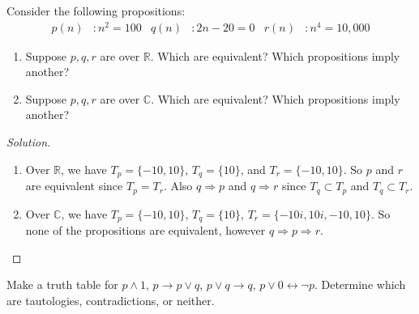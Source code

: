     \begin{problem}
    Consider the following propositions:
    \begin{align*}
        p(n)&:n^{2}=100 & q(n)&:2n-20=0 & r(n)&:n^{4}=10,000
    \end{align*}
    \begin{enumerate}
        \item Suppose $p,q,r$ are over $\mathbb{R}$. Which are equivalent? Which propositions imply another?
        \item Suppose $p,q,r$ are over $\mathbb{C}$. Which are equivalent? Which propositions imply another?
    \end{enumerate}
    \end{problem}
    \begin{proof}[Solution]
    \vspace{-\topsep}
    \
    \begin{enumerate}
        \item Over $\mathbb{R}$, we have $T_{p} = \{-10,10\}$, $T_{q} = \{10\}$, and $T_{r} = \{-10,10\}$. So $p$ and $r$ are equivalent since $T_{p} = T_{r}$. Also $q\Rightarrow p$ and $q\Rightarrow r$ since $T_{q} \subset T_{p}$ and $T_{q}\subset T_{r}$.
        \item Over $\mathbb{C}$, we have $T_{p} = \{-10,10\}$, $T_{q} = \{10\}$, $T_{r} = \{-10i,10i,-10,10\}$. So none of the propositions are equivalent, however $q\Rightarrow p \Rightarrow r$.
    \end{enumerate}
    \end{proof}
    \begin{problem}
    \label{problem:discrete structures_make_a_truth_table_for_p_and_1_and_more}
    Make a truth table for $p\land 1$, $p\rightarrow p\lor q$, $p\lor q \rightarrow q$, $p\lor 0 \leftrightarrow \neg p$. Determine which are tautologies, contradictions, or neither.
    \end{problem}
